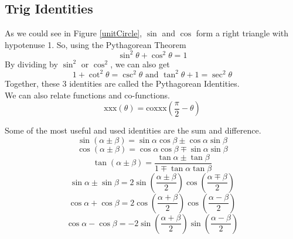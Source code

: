 \subsection{Trig Identities}
\noindent
As we could see in Figure \ref{unitCircle}, $\sin$ and $\cos$ form a right triangle with hypotenuse 1. So, using the Pythagorean Theorem
\begin{equation*}
	\sin^2{\theta} + \cos^2{\theta} = 1
\end{equation*}
By dividing by $\sin^2$ or $\cos^2$, we can also get
\begin{equation*}
	1 + \cot^2{\theta} = \csc^2{\theta} \text{ and } \tan^2{\theta} + 1 = \sec^2{\theta}
\end{equation*}
Together, these 3 identities are called the Pythagorean Identities.\\

\noindent
We can also relate functions and co-functions.
\begin{equation*}
	\text{xxx}(\theta) = \text{coxxx}\left(\frac{\pi}{2} - \theta\right)
\end{equation*}

\noindent
Some of the most useful and used identities are the sum and difference.
\begin{equation*}
	\sin{\left(\alpha \pm \beta\right)} = \sin{\alpha}\cos{\beta} \pm \cos{\alpha}\sin{\beta}
\end{equation*} \begin{equation*}
	\cos{\left(\alpha \pm \beta\right)} = \cos{\alpha}\cos{\beta} \mp \sin{\alpha}\sin{\beta}
\end{equation*} \begin{equation*}
	\tan{\left(\alpha \pm \beta\right)} = \frac{\tan{\alpha} \pm \tan{\beta}}{1 \mp \tan{\alpha}\tan{\beta}}
\end{equation*} \begin{equation*}
	\sin{\alpha} \pm \sin{\beta} = 2\sin{\left(\frac{\alpha \pm \beta}{2}\right)}\cos{\left(\frac{\alpha \mp \beta}{2}\right)}
\end{equation*} \begin{equation*}
	\cos{\alpha} + \cos{\beta} = 2\cos{\left(\frac{\alpha + \beta}{2}\right)}\cos{\left(\frac{\alpha - \beta}{2}\right)}
\end{equation*} \begin{equation*}
	\cos{\alpha} - \cos{\beta} = -2\sin{\left(\frac{\alpha + \beta}{2}\right)}\sin{\left(\frac{\alpha - \beta}{2}\right)}
\end{equation*}